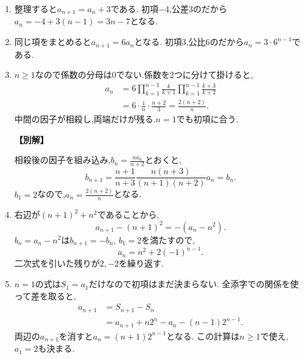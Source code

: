 \begin{enumerate}[label=\textbf{問\arabic*.},leftmargin=3.8em,format=\bookitemlink{practice-basic}{solution}{problem}]
  \item {}\BookMathLayout{}{\\}
    整理すると$a_{n+1}=a_n+3$である.
    初項$-4$,公差$3$のだから$a_n=-4+3(n-1)=3n-7$となる.

  \item {}\BookMathLayout{}{\\}
    同じ項をまとめると$a_{n+1}=6a_n$となる.
    初項$3$,公比$6$のだから$a_n=3\cdot6^{n-1}$である.

  \item {}\BookMathLayout{}{\\}
    $n\ge1$なので係数の分母は0でない.係数を2つに分けて掛けると,
    \[
      \begin{aligned}
        a_n&=6\prod_{k=1}^{n-1}\frac{k}{k+1}
        \prod_{k=1}^{n-1}\frac{k+3}{k+2}\\
        &=6\cdot\frac1n\cdot\frac{n+2}3
        =\frac{2(n+2)}n.
      \end{aligned}
    \]
    中間の因子が相殺し,両端だけが残る.$n=1$でも初項に合う.
    \par\smallskip\noindent\textbf{【別解】}\par
    相殺後の因子を組み込み,$b_n=\frac{na_n}{n+2}$とおくと,
    \[
      b_{n+1}=\frac{n+1}{n+3}
      \frac{n(n+3)}{(n+1)(n+2)}a_n=b_n.
    \]
    $b_1=2$なので,$a_n=\frac{2(n+2)}{n}$となる.

  \item {}\BookMathLayout{}{\\}
    右辺が$(n+1)^2+n^2$であることから,
    \[
      a_{n+1}-(n+1)^2=-(a_n-n^2).
    \]
    $b_n=a_n-n^2$は$b_{n+1}=-b_n$, $b_1=2$を満たすので,
    \[
      a_n=n^2+2(-1)^{n-1}.
    \]
    二次式を引いた残りが$2,-2$を繰り返す.

  \item {}\BookMathLayout{}{\\}
    $n=1$の式は$S_1=a_1$だけなので初項はまだ決まらない.
    全添字での関係を使って差を取ると,
    \[
      \begin{aligned}
        a_{n+1}&=S_{n+1}-S_n\\
        &=a_{n+1}+n2^n-a_n-(n-1)2^{n-1}.
      \end{aligned}
    \]
    両辺の$a_{n+1}$を消すと$a_n=(n+1)2^{n-1}$となる.
    この計算は$n\ge1$で使え,$a_1=2$も決まる.


\end{enumerate}
